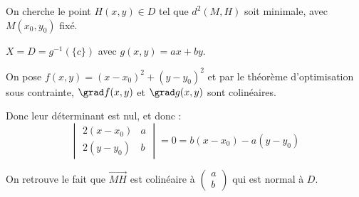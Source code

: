 \begin{exemple}
    


\begin{center}


\end{center}

On cherche le point $H(x, y) \in D$ tel que $ d^2(M, H) $ soit minimale, avec $M(x_0, y_0)$ fixé.

$X = D = g^{-1}(\{c\})$ avec $g(x, y) = ax + by$.

On pose $f(x, y) = (x - x_0)^2 + (y - y_0)^2$ et par le théorème d'optimisation sous contrainte,
$\grad f (x, y)$ et $\grad g(x, y)$ sont colinéaires.

Donc leur déterminant est nul, et donc : 
$$\begin{vmatrix}
    2(x - x_0) & a \\
    2(y - y_0) & b
\end{vmatrix} = 0 = b(x - x_0) - a (y - y_0)$$

On retrouve le fait que $\overrightarrow{MH}$ est colinéaire à $\begin{pmatrix}
    a \\
    b
\end{pmatrix}$ qui est normal à $D$.
\end{exemple}

